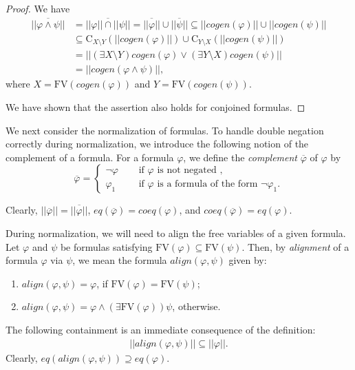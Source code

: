 \documentclass{lmcs}
\def\C{\textrm{C}}
\def\eq{eq}
\def\coeq{coeq}
\def\al{align}
\def\FV{\textrm{FV}}
\def\cogen{cogen}
\begin{document}
\begin{proof}
We have
\begin{align*}
\overline{||\varphi\wedge\psi||}&= \overline{||\varphi||\cap||\psi||}=\overline{||\varphi||}\cup\overline{||\psi||}\subseteq||\cogen(\varphi)||\cup||\cogen(\psi)||\\
&\subseteq\C_{X\setminus Y}(||\cogen(\varphi)||)\cup\C_{Y\setminus X}(||\cogen(\psi)||)\\
&=||(\exists X\setminus Y)\cogen(\varphi)\vee(\exists Y\setminus X)\cogen(\psi)||\\
&=||\cogen(\varphi\wedge\psi)||,
\end{align*}
where $X=\FV(\cogen(\varphi))$ and $Y=\FV(\cogen(\psi))$.

We have shown that the assertion also holds for conjoined formulas.
\end{proof}

We next consider the normalization of formulas. To handle double negation correctly during normalization, we introduce the following notion of the complement of a formula. For a formula $\varphi$, we define the \emph{complement} $\overline \varphi$ of $\varphi$ by
\[
\overline\varphi =
\begin{cases} 
\neg\varphi\quad&\textrm{ if }\varphi\textrm{ is not negated },\\
\varphi_1\quad&\textrm{ if }\varphi\textrm{ is a formula of the form }\neg\varphi_1.
\end{cases}
\] 

Clearly, $||\overline\varphi||=\overline{||\varphi||}$, $\eq(\overline\varphi)=\coeq(\varphi)$, and $\coeq(\overline\varphi)=\eq(\varphi)$.


During normalization, we will need to align the free variables of a given formula. Let $\varphi$ and $\psi$ be formulas satisfying $\FV(\varphi)\subseteq\FV(\psi)$. Then, by \emph{alignment} of a formula $\varphi$ via $\psi$, we mean the formula $\al(\varphi,\psi)$ given by:
\begin{enumerate}
\item $\al(\varphi,\psi)=\varphi$, if $\FV(\varphi)=\FV(\psi)$;
\item $\al(\varphi,\psi)=\varphi\wedge(\exists \FV(\varphi))\psi$, otherwise.  
\end{enumerate}
The following containment is an immediate consequence of the definition:
\begin{align}
||\al(\varphi,\psi)||\subseteq||\varphi||.\label{eq:align_subseteq}
\end{align}
Clearly, $\eq(\al(\varphi,\psi))\supseteq\eq(\varphi)$.
\end{document}
